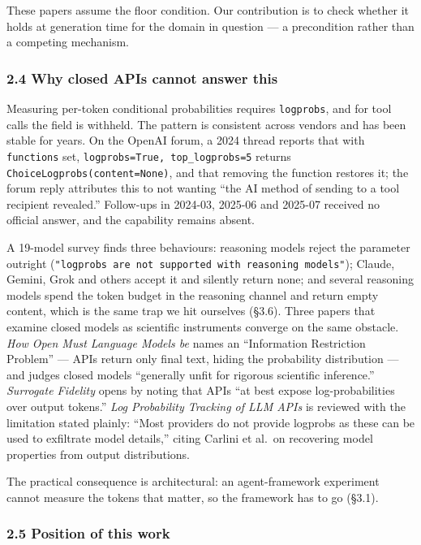 \documentclass[
  11pt,
]{article}
\begin{document}
These papers assume the floor condition. Our contribution is to check
whether it holds at generation time for the domain in question --- a
precondition rather than a competing mechanism.

\hypertarget{why-closed-apis-cannot-answer-this}{%
\subsubsection{2.4 Why closed APIs cannot answer
this}\label{why-closed-apis-cannot-answer-this}}

Measuring per-token conditional probabilities requires
\texttt{logprobs}, and for tool calls the field is withheld. The pattern
is consistent across vendors and has been stable for years. On the
OpenAI forum, a 2024 thread reports that with \texttt{functions} set,
\texttt{logprobs=True,\ top\_logprobs=5} returns
\texttt{ChoiceLogprobs(content=None)}, and that removing the function
restores it; the forum reply attributes this to not wanting ``the AI
method of sending to a tool recipient revealed.'' Follow-ups in 2024-03,
2025-06 and 2025-07 received no official answer, and the capability
remains absent.

A 19-model survey finds three behaviours: reasoning models reject the
parameter outright
(\texttt{"logprobs\ are\ not\ supported\ with\ reasoning\ models"});
Claude, Gemini, Grok and others accept it and silently return none; and
several reasoning models spend the token budget in the reasoning channel
and return empty content, which is the same trap we hit ourselves
(§3.6). Three papers that examine closed models as scientific
instruments converge on the same obstacle. \emph{How Open Must Language
Models be} names an ``Information Restriction Problem'' --- APIs return
only final text, hiding the probability distribution --- and judges
closed models ``generally unfit for rigorous scientific inference.''
\emph{Surrogate Fidelity} opens by noting that APIs ``at best expose
log-probabilities over output tokens.'' \emph{Log Probability Tracking
of LLM APIs} is reviewed with the limitation stated plainly: ``Most
providers do not provide logprobs as these can be used to exfiltrate
model details,'' citing Carlini et al.~on recovering model properties
from output distributions.

The practical consequence is architectural: an agent-framework
experiment cannot measure the tokens that matter, so the framework has
to go (§3.1).

\hypertarget{position-of-this-work}{%
\subsubsection{2.5 Position of this work}\label{position-of-this-work}}
\end{document}
